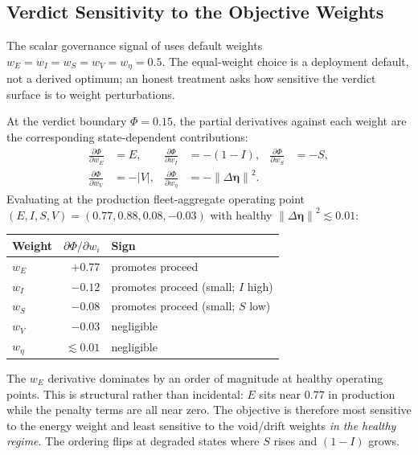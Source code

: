 \documentclass[11pt,twocolumn]{article}
\newcommand{\norm}[1]{\left\lVert #1 \right\rVert}
\newcommand{\abs}[1]{\left| #1 \right|}
\newcommand{\deta}{\ensuremath{\Delta\bm{\eta}}}
\begin{document}
\subsection{Verdict Sensitivity to the Objective Weights}
\label{sec:phi-sensitivity}

The scalar governance signal of  uses default weights
$w_E = w_I = w_S = w_V = w_\eta = 0.5$. The equal-weight choice is
a deployment default, not a derived optimum; an honest treatment
asks how sensitive the verdict surface is to weight perturbations.

At the verdict boundary $\Phi = 0.15$, the partial derivatives
against each weight are the corresponding state-dependent
contributions:
\begin{align*}
  \frac{\partial \Phi}{\partial w_E} &= E,
  & \frac{\partial \Phi}{\partial w_I} &= -(1-I),
  & \frac{\partial \Phi}{\partial w_S} &= -S, \\
  \frac{\partial \Phi}{\partial w_V} &= -\abs{V},
  & \frac{\partial \Phi}{\partial w_\eta} &= -\norm{\deta}^2.
\end{align*}
Evaluating at the production fleet-aggregate operating point
$(E, I, S, V) = (0.77, 0.88, 0.08, -0.03)$ with healthy
$\norm{\deta}^2 \lesssim 0.01$:
\begin{center}
\small
\setlength{\tabcolsep}{4pt}
\begin{tabular}{@{}lrl@{}}
\toprule
\textbf{Weight} & $\partial\Phi/\partial w_i$ & \textbf{Sign} \\
\midrule
$w_E$ & $+0.77$ & promotes proceed \\
$w_I$ & $-0.12$ & promotes proceed (small; $I$ high) \\
$w_S$ & $-0.08$ & promotes proceed (small; $S$ low) \\
$w_V$ & $-0.03$ & negligible \\
$w_\eta$ & $\lesssim 0.01$ & negligible \\
\bottomrule
\end{tabular}
\end{center}
The $w_E$ derivative dominates by an order of magnitude at healthy
operating points. This is structural rather than incidental: $E$
sits near $0.77$ in production while the penalty terms are all
near zero. The objective is therefore most sensitive to the
energy weight and least sensitive to the void/drift weights
\emph{in the healthy regime}. The ordering flips at degraded
states where $S$ rises and $(1-I)$ grows.
\end{document}
